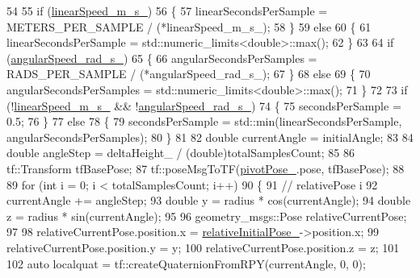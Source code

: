 \begin{DoxyCode}
54 
55         \textcolor{keywordflow}{if} (\hyperlink{classcl__move__group__interface_1_1CbCircularPouringMotion_ac78ce543451cbb78c95862dd4273deb7}{linearSpeed\_m\_s\_})
56         \{
57             linearSecondsPerSample = METERS\_PER\_SAMPLE / (*linearSpeed\_m\_s\_);
58         \}
59         \textcolor{keywordflow}{else}
60         \{
61             linearSecondsPerSample = std::numeric\_limits<double>::max();
62         \}
63 
64         \textcolor{keywordflow}{if} (\hyperlink{classcl__move__group__interface_1_1CbCircularPouringMotion_a7f69b3f95281fc14902117d637b59972}{angularSpeed\_rad\_s\_})
65         \{
66             angularSecondsPerSamples = RADS\_PER\_SAMPLE / (*angularSpeed\_rad\_s\_);
67         \}
68         \textcolor{keywordflow}{else}
69         \{
70             angularSecondsPerSamples = std::numeric\_limits<double>::max();
71         \}
72 
73         \textcolor{keywordflow}{if} (!\hyperlink{classcl__move__group__interface_1_1CbCircularPouringMotion_ac78ce543451cbb78c95862dd4273deb7}{linearSpeed\_m\_s\_} && !\hyperlink{classcl__move__group__interface_1_1CbCircularPouringMotion_a7f69b3f95281fc14902117d637b59972}{angularSpeed\_rad\_s\_})
74         \{
75             secondsPerSample = 0.5;
76         \}
77         \textcolor{keywordflow}{else}
78         \{
79             secondsPerSample = std::min(linearSecondsPerSample, angularSecondsPerSamples);
80         \}
81 
82         \textcolor{keywordtype}{double} currentAngle = initialAngle;
83 
84         \textcolor{keywordtype}{double} angleStep = deltaHeight\_ / (double)totalSamplesCount;
85 
86         tf::Transform tfBasePose;
87         tf::poseMsgToTF(\hyperlink{classcl__move__group__interface_1_1CbCircularPouringMotion_a58ce9c29e4ef8f09a7569d6d8f9df56b}{pivotPose\_}.pose, tfBasePose);
88 
89         \textcolor{keywordflow}{for} (\textcolor{keywordtype}{int} i = 0; i < totalSamplesCount; i++)
90         \{
91             \textcolor{comment}{// relativePose i}
92             currentAngle += angleStep;
93             \textcolor{keywordtype}{double} y = radius * cos(currentAngle);
94             \textcolor{keywordtype}{double} z = radius * sin(currentAngle);
95 
96             geometry\_msgs::Pose relativeCurrentPose;
97 
98             relativeCurrentPose.position.x = \hyperlink{classcl__move__group__interface_1_1CbCircularPouringMotion_ab6323315364e1f8bc60cbad3daa72fa9}{relativeInitialPose\_}->position.x;
99             relativeCurrentPose.position.y = y;
100             relativeCurrentPose.position.z = z;
101 
102             \textcolor{keyword}{auto} localquat = tf::createQuaternionFromRPY(currentAngle, 0, 0);

\end{DoxyCode}
